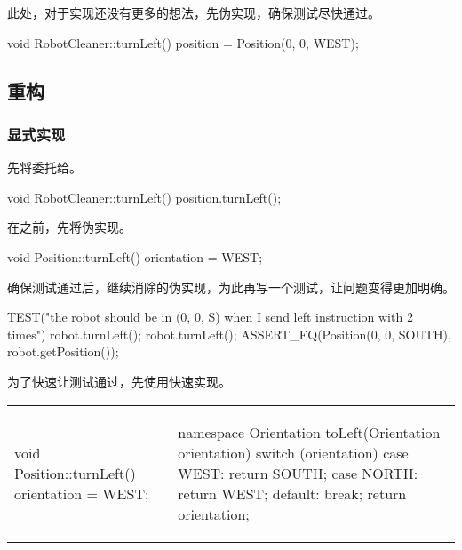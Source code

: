 \begin{content}
此处，对于实现还没有更多的想法，先伪实现，确保测试尽快通过。

\begin{leftbar}
\begin{c++}[caption={src/robot-cleaner/RobotCleaner.cpp}]
void RobotCleaner::turnLeft()
{
    position = Position(0, 0, WEST);
}
\end{c++}
\end{leftbar}

\subsection{重构}

\subsubsection{显式实现}

先将委托给。

\begin{leftbar}
\begin{c++}[caption={src/robot-cleaner/RobotCleaner.cpp}]
void RobotCleaner::turnLeft()
{
    position.turnLeft();
}
\end{c++}
\end{leftbar}

在之前，先将伪实现。

\begin{leftbar}
\begin{c++}[caption={src/robot-cleaner/Position.cpp}]
void Position::turnLeft()
{
    orientation = WEST;
}
\end{c++}
\end{leftbar}

确保测试通过后，继续消除的伪实现，为此再写一个测试，让问题变得更加明确。

\begin{leftbar}
\begin{c++}[caption={test/robot-cleaner/TestRobotCleaner.h}]
TEST("the robot should be in (0, 0, S) when I send left instruction with 2 times")
{
    robot.turnLeft();
    robot.turnLeft();
    ASSERT_EQ(Position(0, 0, SOUTH), robot.getPosition());
}
\end{c++}
\end{leftbar}

为了快速让测试通过，先使用快速实现。

\begin{tabular}{@{}p{} 
                 | p{}@{}}
\begin{c++}[caption={src/robot-cleaner/Position.cpp}]
void Position::turnLeft()
{
    orientation = WEST;
}
\end{c++}
&
\begin{c++}[caption={src/robot-cleaner/Position.cpp}]
namespace
{
    Orientation toLeft(Orientation orientation)
    {
        switch (orientation)
        {
        case WEST:  return SOUTH;
        case NORTH: return WEST;
        default: break;
        }     
        return orientation;
    }
}


\end{c++}
\end{tabular}
\end{content}
